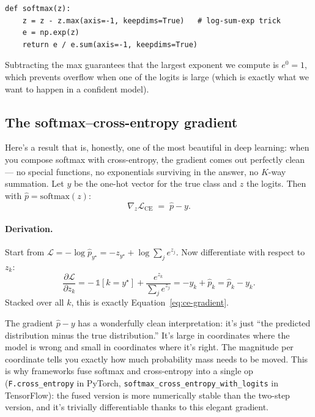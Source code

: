 \documentclass[11pt, a4paper]{article}
\newcommand{\Loss}{\mathcal{L}}
\begin{document}
\begin{lstlisting}
def softmax(z):
    z = z - z.max(axis=-1, keepdims=True)   # log-sum-exp trick
    e = np.exp(z)
    return e / e.sum(axis=-1, keepdims=True)
\end{lstlisting}

\noindent
Subtracting the max guarantees that the largest exponent we compute is $e^0 = 1$, which prevents overflow when one of the logits is large (which is exactly what we want to happen in a confident model).

\subsection{The softmax--cross-entropy gradient}

Here's a result that is, honestly, one of the most beautiful in deep learning: when you compose softmax with cross-entropy, the gradient comes out perfectly clean --- no special functions, no exponentials surviving in the answer, no $K$-way summation. Let $y$ be the one-hot vector for the true class and $z$ the logits. Then with $\hat p = \mathrm{softmax}(z)$:
\begin{equation}
\boxed{
    \nabla_z \Loss_{\mathrm{CE}} \;=\; \hat p - y.
}
    \label{eq:ce-gradient}
\end{equation}

\paragraph{Derivation.} Start from
$\Loss = -\log \hat p_{y^\star} = -z_{y^\star} + \log \sum_j e^{z_j}.$
Now differentiate with respect to $z_k$:
\begin{equation*}
    \frac{\partial \Loss}{\partial z_k}
    = -\,\mathbb{1}[k = y^\star] + \frac{e^{z_k}}{\sum_j e^{z_j}}
    = -y_k + \hat p_k
    = \hat p_k - y_k.
\end{equation*}
Stacked over all $k$, this is exactly Equation~\eqref{eq:ce-gradient}.

\begin{intuitionbox}
The gradient $\hat p - y$ has a wonderfully clean interpretation: it's just ``the predicted distribution minus the true distribution.'' It's large in coordinates where the model is wrong and small in coordinates where it's right. The magnitude per coordinate tells you exactly how much probability mass needs to be moved. This is why frameworks fuse softmax and cross-entropy into a single op (\verb|F.cross_entropy| in PyTorch, \verb|softmax_cross_entropy_with_logits| in TensorFlow): the fused version is more numerically stable than the two-step version, and it's trivially differentiable thanks to this elegant gradient.
\end{intuitionbox}
\end{document}

